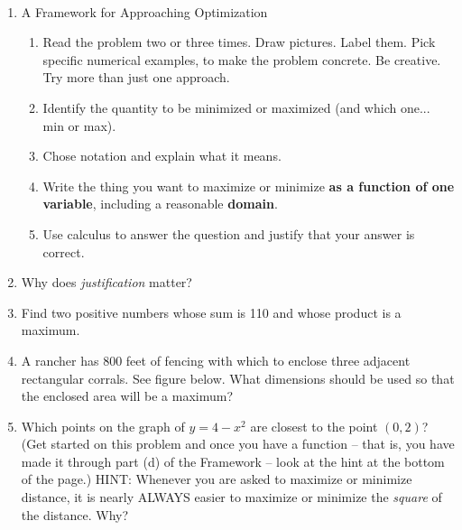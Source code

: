 \documentclass[11pt,fleqn]{article}
\begin{document}
\vspace*{-0.7in}

\begin{center}
  \Large{}\\
\end{center}
\begin{enumerate}
\item A Framework for Approaching Optimization
\begin{enumerate}
\item Read the problem two or three times. Draw pictures. Label them. Pick specific numerical examples, to make the problem concrete. Be creative. Try more than just one approach.\\
\vspace{0.5in}
\item Identify the quantity to be minimized or maximized (and which one... min or max).\\
\vspace{0.5in}
\item Chose notation and explain what it means.\\
\vspace{1in}
\item Write the thing you want to maximize or minimize \textbf{as a function of one variable}, including a reasonable \textbf{domain}.
\vspace{1in}
\item Use calculus to answer the question and justify that your answer is correct.\\
\vfill
\end{enumerate}
\item Why does \emph{justification} matter?\\
\vfill
\newpage
\item  Find two positive numbers whose sum is 110 and whose product is a maximum.
\newpage
\item A rancher has 800 feet of fencing with which to
  enclose three adjacent rectangular corrals. See figure below. What dimensions should
  be used so that the enclosed area will be a maximum?\\
  
  \newpage
\item Which points on the graph of $y = 4-x^2$ are
  closest to the point $(0, 2)$? (Get started on this problem and once you have a function -- that is, you have made it through part (d) of the Framework -- look at the hint at the bottom of the page.)
  \vfill
  HINT: Whenever you are asked to maximize or minimize distance, it is nearly ALWAYS easier to maximize or minimize the \emph{square} of the distance. Why? 
\end{enumerate}
\end{document}
